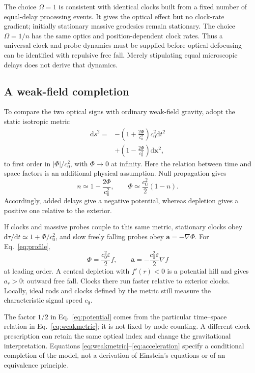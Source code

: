 \documentclass[aps,prd,reprint,nofootinbib]{revtex4-2}
\newcommand{\dd}{\mathrm{d}}
\newcommand{\ve}{\varepsilon}
\begin{document}
The choice $\Omega=1$ is consistent with identical clocks built from a
fixed number of equal-delay processing events. It gives the optical
effect but no clock-rate gradient; initially stationary massive
geodesics remain stationary. The choice $\Omega=1/n$ has the same
optics and position-dependent clock rates. Thus a universal clock and
probe dynamics must be supplied before optical defocusing can be
identified with repulsive free fall. Merely stipulating equal
microscopic delays does not derive that dynamics.

\subsection{A weak-field completion}

To compare the two optical signs with ordinary weak-field gravity,
adopt the static isotropic metric
\begin{equation}
 \begin{split}
 \dd s^2={}&-\left(1+\frac{2\Phi}{c_0^2}\right)c_0^2\dd t^2\\
          &+\left(1-\frac{2\Phi}{c_0^2}\right)\dd\mathbf x^2,
 \end{split}
 \label{eq:weakmetric}
\end{equation}
to first order in $|\Phi|/c_0^2$, with $\Phi\to0$ at infinity. Here the
relation between time and space factors is an additional physical
assumption. Null propagation gives
\begin{equation}
 n\simeq1-\frac{2\Phi}{c_0^2},
 \qquad
 \Phi\simeq\frac{c_0^2}{2}(1-n).
 \label{eq:potential}
\end{equation}
Accordingly, added delays give a negative potential, whereas depletion
gives a positive one relative to the exterior.

If clocks and massive probes couple to this same metric, stationary
clocks obey $\dd\tau/\dd t\simeq1+\Phi/c_0^2$, and slow freely falling
probes obey $\mathbf a=-\nabla\Phi$. For Eq.~\eqref{eq:profile},
\begin{equation}
 \Phi=\frac{c_0^2\ve}{2}f,
 \qquad
 \mathbf a=-\frac{c_0^2\ve}{2}\nabla f
 \label{eq:acceleration}
\end{equation}
at leading order. A central depletion with $f'(r)<0$ is a potential
hill and gives $a_r>0$: outward free fall. Clocks there run faster
relative to exterior clocks. Locally, ideal rods and clocks defined by
the metric still measure the characteristic signal speed $c_0$.

The factor $1/2$ in Eq.~\eqref{eq:potential} comes from the particular
time--space relation in Eq.~\eqref{eq:weakmetric}; it is not fixed by
node counting. A different clock prescription can retain the same
optical index and change the gravitational interpretation. Equations
\eqref{eq:weakmetric}--\eqref{eq:acceleration} specify a conditional
completion of the model, not a derivation of Einstein's equations or
of an equivalence principle.
\end{document}
